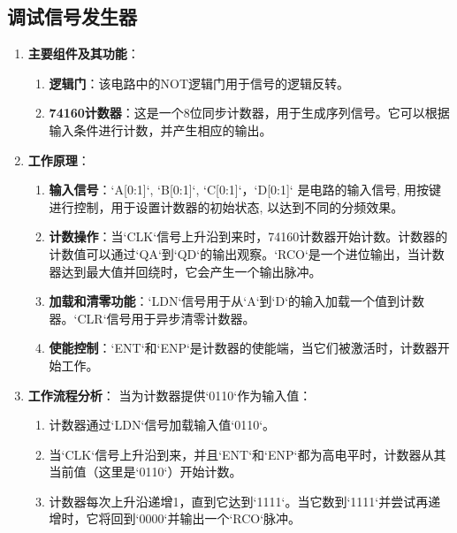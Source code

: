 \documentclass[UTF8,titlepage,a4paper]{ctexart}
\numberwithin{figure}{section}
\begin{document}
\subsection{调试信号发生器}
\begin{enumerate}
    \item \textbf{主要组件及其功能}：
    \begin{enumerate}
        \item \textbf{逻辑门}：该电路中的NOT逻辑门用于信号的逻辑反转。
        
        \item \textbf{74160计数器}：这是一个8位同步计数器，用于生成序列信号。它可以根据输入条件进行计数，并产生相应的输出。
    \end{enumerate}
    
    \item \textbf{工作原理}：
    \begin{enumerate}
        \item \textbf{输入信号}：`A[0:1]`, `B[0:1]`,  `C[0:1]`，`D[0:1]` 是电路的输入信号, 用按键进行控制，用于设置计数器的初始状态, 以达到不同的分频效果。
        
        \item \textbf{计数操作}：当`CLK`信号上升沿到来时，74160计数器开始计数。计数器的计数值可以通过`QA`到`QD`的输出观察。`RCO`是一个进位输出，当计数器达到最大值并回绕时，它会产生一个输出脉冲。
        
        \item \textbf{加载和清零功能}：`LDN`信号用于从`A`到`D`的输入加载一个值到计数器。`CLR`信号用于异步清零计数器。
        
        \item \textbf{使能控制}：`ENT`和`ENP`是计数器的使能端，当它们被激活时，计数器开始工作。
    \end{enumerate}
    
    \item \textbf{工作流程分析}：
    当为计数器提供`0110`作为输入值：
    \begin{enumerate}
        \item 计数器通过`LDN`信号加载输入值`0110`。
        
        \item 当`CLK`信号上升沿到来，并且`ENT`和`ENP`都为高电平时，计数器从其当前值（这里是`0110`）开始计数。
        
        \item 计数器每次上升沿递增1，直到它达到`1111`。当它数到`1111`并尝试再递增时，它将回到`0000`并输出一个`RCO`脉冲。
        

\end{enumerate}
\end{enumerate}
\end{document}
